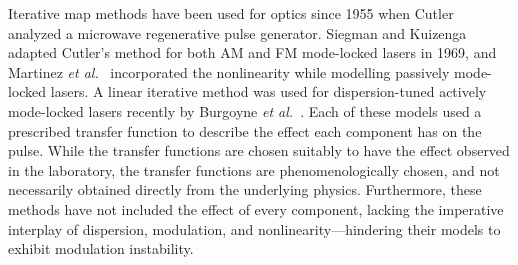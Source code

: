 \documentclass[9pt,twocolumn,twoside]{osajnl}
\begin{document}
Iterative map methods have been used for optics since 1955 when Cutler~\cite{cutler1955} analyzed a microwave regenerative pulse generator. Siegman and Kuizenga~\cite{kuizenga1970a, kuizenga1970b, kuizenga1970, siegman1969} adapted Cutler's method for both AM and FM mode-locked lasers in 1969, and Martinez \emph{et al.}~\cite{martinez1984, martinez1985} incorporated the nonlinearity while modelling passively mode-locked lasers. A linear iterative method was used for dispersion-tuned actively mode-locked lasers recently by Burgoyne \emph{et al.}~\cite{burgoyne2014}. Each of these models used a prescribed transfer function to describe the effect each component has on the pulse. While the transfer functions are chosen suitably to have the effect observed in the laboratory, the transfer functions are phenomenologically chosen, and not necessarily obtained directly from the underlying physics. Furthermore, these methods have not included the effect of every component, lacking the imperative interplay of dispersion, modulation, and nonlinearity---hindering their models to exhibit modulation instability.
\end{document}
